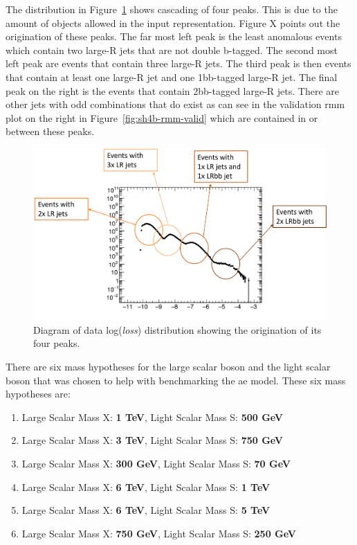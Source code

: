 The distribution in Figure~\ref{fig:sh4b-data-shapes} shows cascading of four peaks. This is due to the amount of objects allowed in the input representation. Figure X points out 
the origination of these peaks. The far most left peak is the least anomalous events which contain two large-R jets that are not double b-tagged. The second most left 
peak are events that contain three large-R jets. The third peak is then events that contain at least one large-R jet and one 1bb-tagged large-R jet. The final peak 
on the right is the events that contain 2bb-tagged large-R jets. There are other jets with odd combinations that do exist as can see in the validation \gls{rmm} plot on the 
right in Figure~\ref{fig:sh4b-rmm-valid} which are contained in or between these peaks. 
\newpage
\begin{figure}[ht]
    \centering
    \includegraphics[scale=0.6]{figs/ch7/data-shapes.png}%
    \caption{Diagram of data log(\textit{loss}) distribution showing the origination of its four peaks.}
\label{fig:sh4b-data-shapes}
\end{figure}

There are six mass hypotheses for the large scalar boson and the light scalar boson that was chosen to help with benchmarking the \gls{ae} model. These six mass hypotheses are:

\begin{enumerate}
    \item Large Scalar Mass X: \textbf{1 TeV}, Light Scalar Mass S: \textbf{500 GeV}
    \item Large Scalar Mass X: \textbf{3 TeV}, Light Scalar Mass S: \textbf{750 GeV}
    \item Large Scalar Mass X: \textbf{300 GeV}, Light Scalar Mass S: \textbf{70 GeV}
    \item Large Scalar Mass X: \textbf{6 TeV}, Light Scalar Mass S: \textbf{1 TeV}
    \item Large Scalar Mass X: \textbf{6 TeV}, Light Scalar Mass S: \textbf{5 TeV}
    \item Large Scalar Mass X: \textbf{750 GeV}, Light Scalar Mass S: \textbf{250 GeV}
\end{enumerate}

